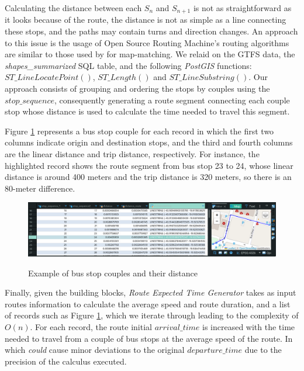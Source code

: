 Calculating the distance between each $S_{n}$ and $S_{n+1}$ is not as straightforward as it looks
because of the route, the distance is not as simple as a line connecting these stops, and the paths
may contain turns and direction changes. An approach to this issue is the usage of 
Open Source Routing Machine's routing algorithms are similar to those used by  for map-matching. We relaid on the GTFS data, the {\em  shapes\_summarized} SQL table, 
and the following \textit{PostGIS} functions:
$ST\_LineLocatePoint()$, $ST\_Length()$ and $ST\_LineSubstring()$. 
Our approach consists of grouping and ordering the stops by couples using the $stop\_sequence$, 
consequently generating a route segment connecting each couple stop whose distance
is used to calculate the time needed to travel this segment.



Figure \ref{img:4:5} represents a bus stop couple for each record in which the first two 
columns indicate origin and destination stops, and the third and fourth columns are the 
linear distance and trip distance, respectively. For instance, the highlighted record
shows the route segment from bus stop 23 to 24, whose linear distance is around 400 meters
and the trip distance is 320 meters, so there is an 80-meter difference.


    \begin{figure}[h]
        \centering
        \caption{Example of bus stop couples and their distance}
        \includegraphics[width=\textwidth]{imagem/cap4/couplepoints.png}
        \label{img:4:5}
    \end{figure}

Finally, given the building blocks, {\em Route Expected Time Generator} takes as input
routes information to calculate the average speed and route duration,
and a list of records such as Figure \ref{img:4:5}, which we iterate through leading 
to the complexity of $O(n)$. For each record, the route initial $arrival\_time$ is 
increased with the time needed to travel from a couple of bus stops at the average
speed of the route. In which {\em could} cause minor deviations to the original $departure\_time$ due to the precision 
of the calculus executed.




